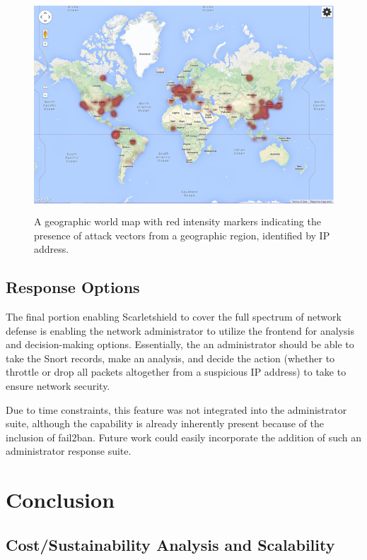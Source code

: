 \documentclass[12pt,letterpaper,titlepage]{report}
\begin{document}
{\begin{figure}[h!]
\centering
  \includegraphics[height=8cm]{./heatmap.png}
  \caption{A geographic world map with red intensity markers indicating
  the presence of attack vectors from a geographic region, identified by IP address.}
\end{figure}

\section{Response Options}

The final portion enabling Scarletshield to cover the full spectrum of network
defense is enabling the network administrator to utilize the frontend for
analysis and decision-making options.  Essentially, the an administrator should
be able to take the Snort records, make an analysis, and decide the action
(whether to throttle or drop all packets altogether from a suspicious IP
address) to take to ensure network security.

Due to time constraints, this feature was not integrated into the administrator
suite, although the capability is already inherently present because of the
inclusion of fail2ban. Future work could easily incorporate the addition of such
an administrator response suite.

\chapter{Conclusion}


\section{Cost/Sustainability Analysis and Scalability}

}
\end{document}
